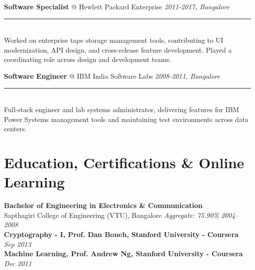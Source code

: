 \documentclass[11pt]{article}
\makeatletter
\newcommand{\roleheader}[3]{%
  {\large\sffamily\textbf{#1} @ #2} \hfill \textit{#3}\\[-0.3em]
  \color{myblue}\rule{\linewidth}{1pt}\\[0.5em]\color{bodytext}
}
\newenvironment{experience}[4]{%
  \roleheader{#1}{#2}{#3}%
  #4\vspace{0.5em}%
}{%
  \vspace{1em}
}
\makeatother
\begin{document}
\begin{experience}{Software Specialist}{Hewlett Packard Enterprise}{2011-2017, Bangalore}{%
  Worked on enterprise tape storage management tools, contributing to UI modernization, API design, and cross-release feature development. Played a coordinating role across design and development teams.%
}
\end{experience}

\begin{experience}{Software Engineer}{IBM India Software Labs}{2008-2011, Bangalore}{%
  Full-stack engineer and lab systems administrator, delivering features for IBM Power Systems management tools and maintaining test environments across data centers.%
}
\end{experience}

\section*{Education, Certifications \& Online Learning}

\textbf{Bachelor of Engineering in Electronics \& Communication} \\
Sapthagiri College of Engineering (VTU), Bangalore \hfill \textit{Aggregate: 75.90\%} \textit{2004–2008}  \\

\vspace{0.5em}
\textbf{Cryptography - I, Prof. Dan Boneh, Stanford University - Coursera} \hfill \textit{Sep 2013} \\

\textbf{Machine Learning, Prof. Andrew Ng, Stanford University - Coursera} \hfill \textit{Dec 2011} \\
\end{document}
